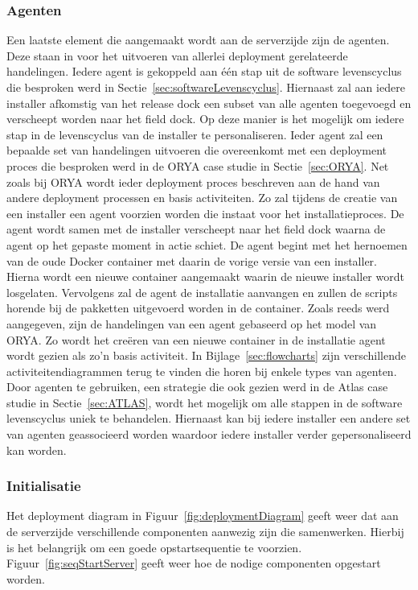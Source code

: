 \subsubsection{Agenten}
Een laatste element die aangemaakt wordt aan de serverzijde zijn de agenten.
Deze staan in voor het uitvoeren van allerlei deployment gerelateerde handelingen.
Iedere agent is gekoppeld aan één stap uit de software levenscyclus die besproken werd in Sectie~\ref{sec:softwareLevenscyclus}.
Hiernaast zal aan iedere installer afkomstig van het release dock een subset van alle agenten toegevoegd en verscheept worden naar het field dock.
Op deze manier is het mogelijk om iedere stap in de levenscyclus van de installer te personaliseren.
Ieder agent zal een bepaalde set van handelingen uitvoeren die overeenkomt met een deployment proces die besproken werd in de ORYA case studie in Sectie~\ref{sec:ORYA}.
Net zoals bij ORYA wordt ieder deployment proces beschreven aan de hand van andere deployment processen en basis activiteiten.
Zo zal tijdens de creatie van een installer een agent voorzien worden die instaat voor het installatieproces.
De agent wordt samen met de installer verscheept naar het field dock waarna de agent op het gepaste moment in actie schiet.
De agent begint met het hernoemen van de oude Docker container met daarin de vorige versie van een installer.
Hierna wordt een nieuwe container aangemaakt waarin de nieuwe installer wordt losgelaten.
Vervolgens zal de agent de installatie aanvangen en zullen de scripts horende bij de pakketten uitgevoerd worden in de container.
Zoals reeds werd aangegeven, zijn de handelingen van een agent gebaseerd op het model van ORYA.
Zo wordt het creëren van een nieuwe container in de installatie agent wordt gezien als zo'n basis activiteit.
In Bijlage~\ref{sec:flowcharts} zijn verschillende activiteitendiagrammen terug te vinden die horen bij enkele types van agenten.
Door agenten te gebruiken, een strategie die ook gezien werd in de Atlas case studie in Sectie~\ref{sec:ATLAS}, wordt het mogelijk om alle stappen in de software levenscyclus uniek te behandelen.
Hiernaast kan bij iedere installer een andere set van agenten geassocieerd worden waardoor iedere installer verder gepersonaliseerd kan worden.

\subsubsection{Initialisatie}\label{sec:initServer}
Het deployment diagram in Figuur~\vref{fig:deploymentDiagram} geeft weer dat aan de serverzijde verschillende componenten aanwezig zijn die samenwerken.
Hierbij is het belangrijk om een goede opstartsequentie te voorzien.
Figuur~\vref{fig:seqStartServer} geeft weer hoe de nodige componenten opgestart worden.


